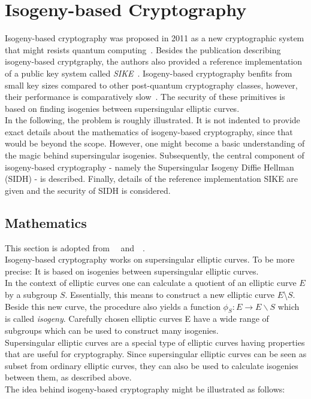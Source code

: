 \section{Isogeny-based Cryptography} \label{sec:isogeny-based_crypto}
Isogeny-based cryptography was proposed in 2011 as a new cryptographic system that might resists quantum computing~\parencite{jao2011towards}. Besides the publication describing isogeny-based cryptgraphy, the authors also provided a reference implementation of a public key system called \textit{SIKE}~\parencite{sike2020spec}. Isogeny-based cryptography benfits from small key sizes compared to other post-quantum cryptography classes, however, their performance is comparatively slow~\parencite{sike2020spec}. The security of these primitives is based on finding isogenies between supersingular elliptic curves.\\
In the following, the problem is roughly illustrated. It is not indented to provide exact details about the mathematics of isogeny-based cryptography, since that would be beyond the scope. However, one might become a basic understanding of the magic behind supersingular isogenies. Subsequently, the central component of isogeny-based cryptography - namely the Supersingular Isogeny Diffie Hellman (\gls{SIDH}) - is described. Finally, details of the reference implementation SIKE are given and the security of \gls{SIDH} is considered.

\subsection{Mathematics}
This section is adopted from~~\parencite{urbanik2017friendly} and~~\parencite{costello2019supersingular}.\\
Isogeny-based cryptography works on supersingular elliptic curves. To be more precise: It is based on isogenies between supersingular elliptic curves.
\\
In the context of elliptic curves one can calculate a quotient of an elliptic curve $E$ by a subgroup $S$. Essentially, this means to construct a new elliptic curve $E$\textbackslash $S$.
Beside this new curve, the procedure also yields a function $\phi_S: E \to E \backslash S$ which is called \textit{isogeny}. Carefully chosen elliptic curves E have a wide range of subgroups which can be used to construct many isogenies.
\\
Supersingular elliptic curves are a special type of elliptic curves having properties that are useful for cryptography. Since supersingular elliptic curves can be seen as subset from ordinary elliptic curves, they can also be used to calculate isogenies between them, as described above.
\\
The idea behind isogeny-based cryptography might be illustrated as follows:

